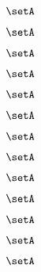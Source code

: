 \begin{forslides}
    \begin{equation}
        \label{eq:slides-processes-70}
        \setA
    \end{equation}

    \begin{equation}
        \label{eq:slides-processes-71}
        \setA
    \end{equation}

    \begin{equation}
        \label{eq:slides-processes-72}
        \setA
    \end{equation}

    \begin{equation}
        \label{eq:slides-processes-73}
        \setA
    \end{equation}

    \begin{equation}
        \label{eq:slides-processes-74}
        \setA
    \end{equation}

    \begin{equation}
        \label{eq:slides-processes-75}
        \setA
    \end{equation}

    \begin{equation}
        \label{eq:slides-processes-76}
        \setA
    \end{equation}

    \begin{equation}
        \label{eq:slides-processes-77}
        \setA
    \end{equation}

    \begin{equation}
        \label{eq:slides-processes-78}
        \setA
    \end{equation}

    \begin{equation}
        \label{eq:slides-processes-79}
        \setA
    \end{equation}

    \begin{equation}
        \label{eq:slides-processes-80}
        \setA
    \end{equation}

    \begin{equation}
        \label{eq:slides-processes-81}
        \setA
    \end{equation}

    \begin{equation}
        \label{eq:slides-processes-82}
        \setA
    \end{equation}


\end{forslides}
